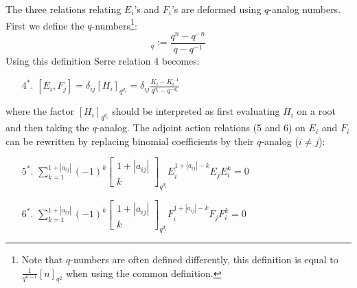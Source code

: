 \begin{construct}
		The three relations relating $E_i$'s and $F_i$'s are deformed using $q$-analog numbers. First we define the $q$-numbers\footnote{Note that $q$-numbers are often defined differently, this definition is equal to $\frac{1}{q^{n-1}}[n]_{q^2}$ when using the common definition.}:
		\begin{equation}
			[n]_q := \frac{q^n - q^{-n}}{q - q^{-1}}
		\end{equation}
		Using this definition Serre relation 4 becomes:
		\begin{enumerate}
			\item[$4^*.$] $[E_i, F_j] = \delta_{ij}[H_i]_{q^{d_i}} = \delta_{ij}\frac{K_i - K_i^{-1}}{q^{d_i} - q^{-d_i}}$
		\end{enumerate}
		where the factor $[H_i]_{q^{d_i}}$ should be interpreted as first evaluating $H_i$ on a root and then taking the $q$-analog. The adjoint action relations (5 and 6) on $E_i$ and $F_i$ can be rewritten by replacing binomial coefficients by their $q$-analog ($i\neq j$):
		\begin{enumerate}
			\item[$5^*.$] $\sum_{k=1}^{1+|a_{ij}|} (-1)^k\begin{bmatrix}1+|a_{ij}|\\k\end{bmatrix}_{q^{d_i}}E_i^{1+|a_{ij}|-k}E_jE_i^k = 0$
			\item[$6^*.$] $\sum_{k=1}^{1+|a_{ij}|} (-1)^k\begin{bmatrix}1+|a_{ij}|\\k\end{bmatrix}_{q^{d_i}}F_i^{1+|a_{ij}|-k}F_jF_i^k = 0$
		\end{enumerate}
	\end{construct}
